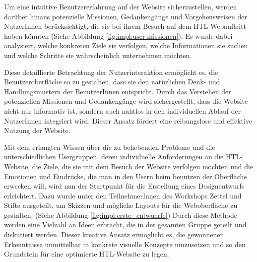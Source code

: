 Um eine intuitive Benutzererfahrung auf der Website sicherzustellen, werden darüber hinaus potenzielle Missionen, 
Gedankengänge und Vorgehensweisen der NutzerInnen berücksichtigt, die sie bei ihrem Besuch auf dem HTL-Webauftritt haben könnten (Siehe Abbildung \ref{fig:impl:user:missionen}). 
Es wurde dabei analysiert, welche konkreten Ziele sie verfolgen, welche Informationen sie suchen und welche Schritte sie wahrscheinlich unternehmen möchten.

Diese detaillierte Betrachtung der Nutzerinteraktion ermöglicht es, die Benutzeroberfläche so zu gestalten, dass sie den natürlichen Denk- und Handlungsmustern 
der BenutzerInnen entspricht. Durch das Verstehen der potenziellen Missionen und Gedankengänge wird sichergestellt, dass die Website nicht nur informativ ist, 
sondern auch nahtlos in den individuellen Ablauf der NutzerInnen integriert wird. Dieser Ansatz fördert eine reibungslose und effektive Nutzung der Website.

Mit dem erlangten Wissen über die zu behebenden Probleme und die unterschiedlichen Usergruppen, deren individuelle Anforderungen 
an die HTL-Website, die Ziele, die sie mit dem Besuch der Website verfolgen möchten und die Emotionen und Eindrücke, die man in den Usern beim benutzen der Oberfläche erwecken will,
wird nun der Startpunkt für die Erstellung eines Designentwurfs erleichtert. Dazu wurde unter den
TeilnehmerInnen des Workshops Zettel und Stifte ausgeteilt, um Skizzen und mögliche Layouts für die Weboberfläche zu gestalten. (Siehe Abbildung \ref{fig:impl:erste_entwuerfe})
Durch diese Methode werden eine Vielzahl an Ideen erbracht, die in der gesamten Gruppe geteilt und diskutiert werden. 
Dieser kreative Ansatz ermöglicht es, die gewonnenen Erkenntnisse 
unmittelbar in konkrete visuelle Konzepte umzusetzen und so den Grundstein für eine optimierte HTL-Website zu legen.

